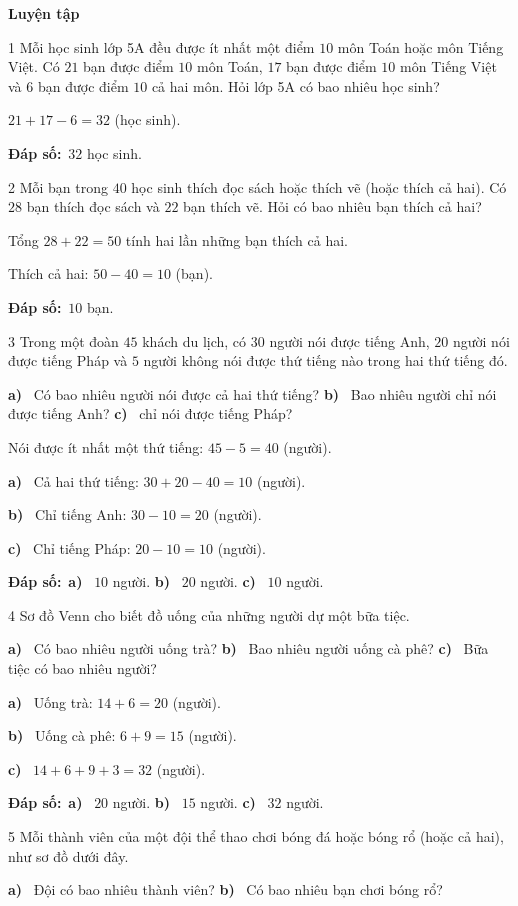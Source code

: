 \documentclass[11pt]{article}
\newif\ifsol \solfalse
\providecommand{\AnsWord}{Đáp số}
\newcommand{\dapso}[1]{\par\textbf{\AnsWord:}\ #1}
\newcommand{\probsol}[1]{%
  \begin{lrbox}{\solmeasure}\begin{minipage}{\dimexpr\linewidth-24pt\relax}#1\end{minipage}\end{lrbox}%
  \ifsol
    \begin{solbox}#1\end{solbox}%
  \else
    \setlength{\solht}{\dimexpr\ht\solmeasure+\dp\solmeasure+0.85cm\relax}%
    \ifdim\solht<1.35cm\setlength{\solht}{1.35cm}\fi
    \begin{tcolorbox}[colback=white,colframe=Line,boxrule=0.8pt,arc=5pt,
      left=8pt,right=8pt,top=4pt,bottom=4pt,height=\solht]{\footnotesize\color{Slate}\itshape\WorkWord}\end{tcolorbox}%
  \fi}
\newcommand{\dividerbar}[1]{\par\vspace{0.6em}\noindent
  \begin{tcolorbox}[enhanced,frame hidden,interior hidden,borderline west={5pt}{0pt}{ProbBlue},
    colback=white,left=12pt,right=12pt,top=5pt,bottom=5pt,arc=4pt]
  {\large\bfseries\color{ProbBlue} #1}\end{tcolorbox}\vspace{0.4em}}
\newcommand{\pa}[1]{\textbf{#1)}\ }
\newcommand{\gap}{\vspace{0.3cm}}
\def\WorkWord{Bài làm:}
\def\AnsWord{Đáp số}
\begin{document}
\dividerbar{Luyện tập}
\begin{probbox}{1}{\relax}
Mỗi học sinh lớp 5A đều được ít nhất một điểm $10$ môn Toán hoặc môn Tiếng Việt. Có $21$ bạn được điểm $10$ môn Toán, $17$ bạn được điểm $10$ môn Tiếng Việt và $6$ bạn được điểm $10$ cả hai môn. Hỏi lớp 5A có bao nhiêu học sinh?
\end{probbox}
\probsol{
$21+17-6=32$ (học sinh).
\dapso{$32$ học sinh.}}
\gap
\begin{probbox}{2}{\relax}
Mỗi bạn trong $40$ học sinh thích đọc sách hoặc thích vẽ (hoặc thích cả hai). Có $28$ bạn thích đọc sách và $22$ bạn thích vẽ. Hỏi có bao nhiêu bạn thích cả hai?
\end{probbox}
\probsol{
Tổng $28+22=50$ tính hai lần những bạn thích cả hai.\par Thích cả hai: $50-40=10$ (bạn).
\dapso{$10$ bạn.}}
\gap
\begin{probbox}{3}{\relax}
Trong một đoàn $45$ khách du lịch, có $30$ người nói được tiếng Anh, $20$ người nói được tiếng Pháp và $5$ người không nói được thứ tiếng nào trong hai thứ tiếng đó.\par
\pa{a} Có bao nhiêu người nói được cả hai thứ tiếng? \quad \pa{b} Bao nhiêu người chỉ nói được tiếng Anh? \quad \pa{c} chỉ nói được tiếng Pháp?
\end{probbox}
\probsol{
Nói được ít nhất một thứ tiếng: $45-5=40$ (người).\par
\pa{a} Cả hai thứ tiếng: $30+20-40=10$ (người).\par
\pa{b} Chỉ tiếng Anh: $30-10=20$ (người).\par
\pa{c} Chỉ tiếng Pháp: $20-10=10$ (người).
\dapso{\pa{a} $10$ người. \pa{b} $20$ người. \pa{c} $10$ người.}}
\gap
\needspace{7.5cm}
\begin{probbox}{4}{\relax}
Sơ đồ Venn cho biết đồ uống của những người dự một bữa tiệc.
\begin{center}
\end{center}
\pa{a} Có bao nhiêu người uống trà? \quad \pa{b} Bao nhiêu người uống cà phê? \quad \pa{c} Bữa tiệc có bao nhiêu người?
\end{probbox}
\probsol{
\pa{a} Uống trà: $14+6=20$ (người).\par
\pa{b} Uống cà phê: $6+9=15$ (người).\par
\pa{c} $14+6+9+3=32$ (người).
\dapso{\pa{a} $20$ người. \pa{b} $15$ người. \pa{c} $32$ người.}}
\gap
\needspace{7.5cm}
\begin{probbox}{5}{\relax}
Mỗi thành viên của một đội thể thao chơi bóng đá hoặc bóng rổ (hoặc cả hai), như sơ đồ dưới đây.
\begin{center}
\end{center}
\pa{a} Đội có bao nhiêu thành viên? \quad \pa{b} Có bao nhiêu bạn chơi bóng rổ?
\end{probbox}
\end{document}
